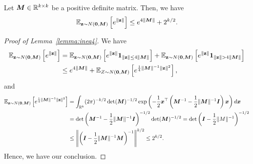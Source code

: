 \begin{lemma} \label{lemma:ineq4}
Let ${\bm{M}} \in \mathbb{R}^{k\times k}$ be a positive definite matrix. Then, we have
\begin{equation*}
    \mathbb{E}_{{\mathbf{z}} \sim N({\bm{0}},{\bm{M}})} \left[ e^{\lVert {\mathbf{z}} \rVert}\right] \leq e^{4 \lVert {\bm{M}}\rVert} + 2^{k/2}.
\end{equation*}
\end{lemma}
\begin{proof}[Proof of Lemma~\ref{lemma:ineq4}]
We have
\begin{align*}
\mathbb{E}_{{\mathbf{z}} \sim N({\bm{0}},{\bm{M}})}\left[ e^{\lVert {\mathbf{z}} \rVert}\right] &= \mathbb{E}_{{\mathbf{z}} \sim N({\bm{0}},{\bm{M}})}\left[ e^{\lVert {\mathbf{z}} \rVert} {\bm{1}}_{\lVert {\mathbf{z}} \rVert \leq 4\lVert {\bm{M}} \rVert}\right] +  \mathbb{E}_{{\mathbf{z}} \sim N({\bm{0}},{\bm{M}})}\left[ e^{\lVert {\mathbf{z}} \rVert} {\bm{1}}_{\lVert {\mathbf{z}} \rVert > 4 \lVert {\bm{M}} \rVert}\right]\\
&\leq e^{4 \lVert {\bm{M}} \rVert} + \mathbb{E}_{Z \sim N({\bm{0}},{\bm{M}})}\left[ e^{\frac{1}{4} \lVert {\bm{M}} \rVert^{-1} \lVert {\mathbf{z}} \rVert^2}\right],
\end{align*}
and
\begin{align*}
\mathbb{E}_{{\mathbf{z}} \sim N({\bm{0}},{\bm{M}})}\left[ e^{\frac{1}{4} \lVert {\bm{M}}\rVert^{-1} \lVert {\mathbf{z}} \rVert^2}\right] &= \int_{\mathbb{R}^k}  (2 \pi)^{-k/2} \det ({\bm{M}})^{-1/2} \exp\left(-\frac{1}{2} {\bm{x}}^\top \left({\bm{M}}^{-1}-\frac{1}{2}\lVert {\bm{M}}\rVert^{-1} {\bm{I}}\right) {\bm{x}}\right)d{\bm{x}}\\
&= \det\left({\bm{M}}^{-1}-\frac{1}{2}\lVert {\bm{M}} \rVert^{-1}{\bm{I}}\right)^{-1/2}\det ({\bm{M}})^{-1/2} = \det\left({\bm{I}} - \frac{1}{2} \lVert M \rVert^{-1} \right)^{-1/2} \\
& \leq \left \lVert \left({\bm{I}} - \frac{1}{2}\lVert {\bm{M}}\rVert^{-1}{\bm{M}} \right)^{-1} \right \rVert^{k/2} \leq 2^{k/2} .
\end{align*}
Hence, we have our conclusion.
\end{proof}

